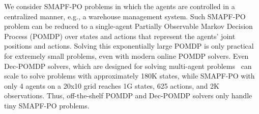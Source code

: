 \documentclass[letterpaper]{article} %
\begin{document}
We consider SMAPF-PO problems in which the agents are controlled in a centralized manner, e.g., a warehouse management system. 
Such SMAPF-PO problem can be reduced to a single-agent Partially Observable Markov Decision Process (POMDP) over states and actions that represent the agents' joint positions and actions. Solving this exponentially large POMDP is only practical for extremely small problems, even with modern online POMDP solvers. Even Dec-POMDP solvers, which are designed for solving multi-agent problems~\cite{amato2019modeling} can scale to solve problems with approximately 180K states, while SMAPF-PO with only 4 agents on a 20x10 grid reaches 1G states, 625 actions, and 2K observations. 
Thus, off-the-shelf POMDP and Dec-POMDP solvers only handle tiny SMAPF-PO problems. 



\end{document}
